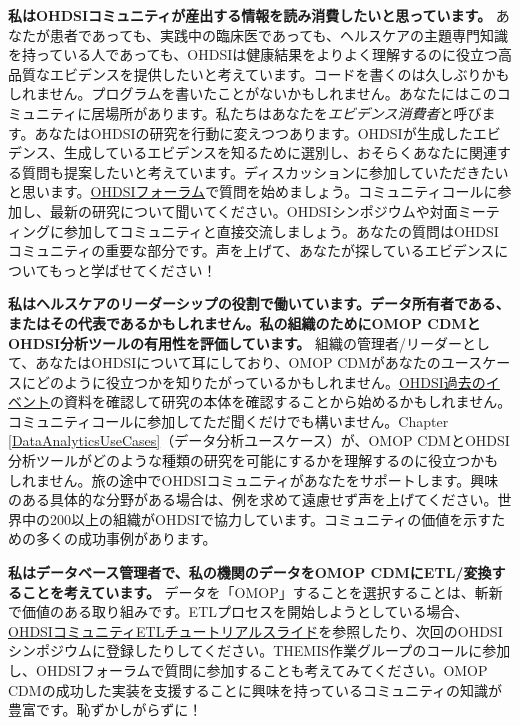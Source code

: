 \documentclass[
  11pt]{book}
\theoremstyle{definition}
\theoremstyle{definition}
\theoremstyle{definition}
\theoremstyle{definition}
\theoremstyle{remark}
\begin{document}
\textbf{私はOHDSIコミュニティが産出する情報を読み消費したいと思っています。} あなたが患者であっても、実践中の臨床医であっても、ヘルスケアの主題専門知識を持っている人であっても、OHDSIは健康結果をよりよく理解するのに役立つ高品質なエビデンスを提供したいと考えています。コードを書くのは久しぶりかもしれません。プログラムを書いたことがないかもしれません。あなたにはこのコミュニティに居場所があります。私たちはあなたを\emph{エビデンス消費者}と呼びます。あなたはOHDSIの研究を行動に変えつつあります。OHDSIが生成したエビデンス、生成しているエビデンスを知るために選別し、おそらくあなたに関連する質問も提案したいと考えています。ディスカッションに参加していただきたいと思います。\href{http://forums.ohdsi.org}{OHDSIフォーラム}で質問を始めましょう。コミュニティコールに参加し、最新の研究について聞いてください。OHDSIシンポジウムや対面ミーティングに参加してコミュニティと直接交流しましょう。あなたの質問はOHDSIコミュニティの重要な部分です。声を上げて、あなたが探しているエビデンスについてもっと学ばせてください！

\textbf{私はヘルスケアのリーダーシップの役割で働いています。データ所有者である、またはその代表であるかもしれません。私の組織のためにOMOP CDMとOHDSI分析ツールの有用性を評価しています。} 組織の管理者/リーダーとして、あなたはOHDSIについて耳にしており、OMOP CDMがあなたのユースケースにどのように役立つかを知りたがっているかもしれません。\href{https://www.ohdsi.org/past-events/}{OHDSI過去のイベント}の資料を確認して研究の本体を確認することから始めるかもしれません。コミュニティコールに参加してただ聞くだけでも構いません。Chapter \ref{DataAnalyticsUseCases}（データ分析ユースケース）が、OMOP CDMとOHDSI分析ツールがどのような種類の研究を可能にするかを理解するのに役立つかもしれません。旅の途中でOHDSIコミュニティがあなたをサポートします。興味のある具体的な分野がある場合は、例を求めて遠慮せず声を上げてください。世界中の200以上の組織がOHDSIで協力しています。コミュニティの価値を示すための多くの成功事例があります。

\textbf{私はデータベース管理者で、私の機関のデータをOMOP CDMにETL/変換することを考えています。} データを「OMOP」することを選択することは、斬新で価値のある取り組みです。ETLプロセスを開始しようとしている場合、\href{https://www.ohdsi-europe.org/images/symposium-2019/tutorials/OHDSI_Vocabulary_CDM_Tutorial.pdf}{OHDSIコミュニティETLチュートリアルスライド}を参照したり、次回のOHDSIシンポジウムに登録したりしてください。THEMIS作業グループのコールに参加し、OHDSIフォーラムで質問に参加することも考えてみてください。OMOP CDMの成功した実装を支援することに興味を持っているコミュニティの知識が豊富です。恥ずかしがらずに！
\end{document}
